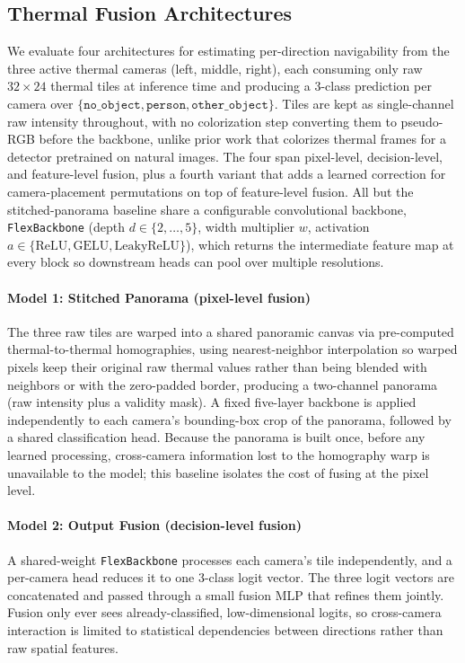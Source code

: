 \subsection{Thermal Fusion Architectures}

We evaluate four architectures for estimating per-direction navigability from the three active thermal cameras (left, middle, right), each consuming only raw $32\times24$ thermal tiles at inference time and producing a 3-class prediction per camera over $\{\texttt{no\_object}, \texttt{person}, \texttt{other\_object}\}$. Tiles are kept as single-channel raw intensity throughout, with no colorization step converting them to pseudo-RGB before the backbone, unlike prior work that colorizes thermal frames for a detector pretrained on natural images. The four span pixel-level, decision-level, and feature-level fusion, plus a fourth variant that adds a learned correction for camera-placement permutations on top of feature-level fusion. All but the stitched-panorama baseline share a configurable convolutional backbone, \texttt{FlexBackbone} (depth $d \in \{2,\dots,5\}$, width multiplier $w$, activation $a \in \{\text{ReLU}, \text{GELU}, \text{LeakyReLU}\}$), which returns the intermediate feature map at every block so downstream heads can pool over multiple resolutions.

\paragraph{Model 1: Stitched Panorama (pixel-level fusion)} The three raw tiles are warped into a shared panoramic canvas via pre-computed thermal-to-thermal homographies, using nearest-neighbor interpolation so warped pixels keep their original raw thermal values rather than being blended with neighbors or with the zero-padded border, producing a two-channel panorama (raw intensity plus a validity mask). A fixed five-layer backbone is applied independently to each camera's bounding-box crop of the panorama, followed by a shared classification head. Because the panorama is built once, before any learned processing, cross-camera information lost to the homography warp is unavailable to the model; this baseline isolates the cost of fusing at the pixel level.

\paragraph{Model 2: Output Fusion (decision-level fusion)} A shared-weight \texttt{FlexBackbone} processes each camera's tile independently, and a per-camera head reduces it to one 3-class logit vector. The three logit vectors are concatenated and passed through a small fusion MLP that refines them jointly. Fusion only ever sees already-classified, low-dimensional logits, so cross-camera interaction is limited to statistical dependencies between directions rather than raw spatial features.


